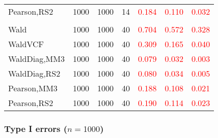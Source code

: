 \documentclass[
]{article}
\begin{document}
\begin{table}[H]
{\begin{tabular}[t]{lrrrrrr}
\hspace{1em}Pearson,RS2 & 1000 & 1000 & 14 & \textcolor{red}{0.184} & \textcolor{red}{0.110} & \textcolor{red}{0.032}\\
\addlinespace[0.3em]
\multicolumn{7}{l}{\textbf{3F 15V}}\\
\hspace{1em}Wald & 1000 & 1000 & 40 & \textcolor{red}{0.704} & \textcolor{red}{0.572} & \textcolor{red}{0.328}\\
\hspace{1em}WaldVCF & 1000 & 1000 & 40 & \textcolor{red}{0.309} & \textcolor{red}{0.165} & \textcolor{red}{0.040}\\
\hspace{1em}WaldDiag,MM3 & 1000 & 1000 & 40 & \textcolor{red}{0.079} & \textcolor{red}{0.032} & \textcolor{red}{0.003}\\
\hspace{1em}WaldDiag,RS2 & 1000 & 1000 & 40 & \textcolor{red}{0.080} & \textcolor{red}{0.034} & \textcolor{red}{0.005}\\
\hspace{1em}Pearson,MM3 & 1000 & 1000 & 40 & \textcolor{red}{0.188} & \textcolor{red}{0.108} & \textcolor{red}{0.021}\\
\hspace{1em}Pearson,RS2 & 1000 & 1000 & 40 & \textcolor{red}{0.190} & \textcolor{red}{0.114} & \textcolor{red}{0.023}\\
\bottomrule
\end{tabular}}
\endgroup{}
\end{table}

\hypertarget{type-i-errors-n1000-1}{%
\subsubsection{\texorpdfstring{Type I errors
(\(n=1000\))}{Type I errors (n=1000)}}\label{type-i-errors-n1000-1}}
\end{document}
